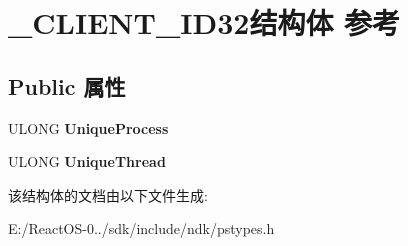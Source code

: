 \hypertarget{struct___c_l_i_e_n_t___i_d32}{}\section{\+\_\+\+C\+L\+I\+E\+N\+T\+\_\+\+I\+D32结构体 参考}
\label{struct___c_l_i_e_n_t___i_d32}
\subsection*{Public 属性}
\begin{DoxyCompactItemize}
\item 
\mbox{\label{struct___c_l_i_e_n_t___i_d32_a77a439a52a981f4c58f9267cf296585e}} 
U\+L\+O\+NG {\bfseries Unique\+Process}
\item 
\mbox{\label{struct___c_l_i_e_n_t___i_d32_ae253a09b9d04908817b9ae7c46a1b355}} 
U\+L\+O\+NG {\bfseries Unique\+Thread}
\end{DoxyCompactItemize}


该结构体的文档由以下文件生成\+:\begin{DoxyCompactItemize}
\item 
E\+:/\+React\+O\+S-\/0../sdk/include/ndk/pstypes.\+h\end{DoxyCompactItemize}
